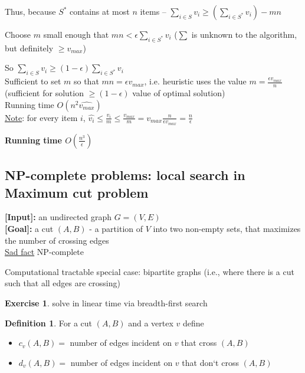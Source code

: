 \documentclass[a4paper,12pt]{article}
\theoremstyle{plain}
\theoremstyle{definition}
\newtheorem{problem}{Exercise}[section]
\newtheorem*{definition}{Definition}
\theoremstyle{remark}
\begin{document}
Thus, because $S^*$ contains at most $n$ items -- $\sum\limits_{i \in S} v_i \geq (\sum\limits_{i \in S^*} v_i) - mn$

Choose $m$ small enough that $mn < \epsilon \sum\limits_{i \in S^*} v_i$ ($\sum$ is unknown to the algorithm, but definitely $\geq v_{max}$)

So $\sum\limits_{i \in S} v_i \geq (1 - \epsilon) \sum\limits_{i \in S^*} v_i$
\\

Sufficient to set $m$ so that \underline{$mn = \epsilon v_{max}$}, i.e. heuristic uses the value $m = \frac{\epsilon v_{max}}{n}$ (sufficient for solution $\geq (1 - \epsilon)$ value of optimal solution)
\\

Running time $O(n^2 \widehat{v_{max}})$
\\

\underline{Note}: for every item $i$, $\widehat{v_i} \leq \frac{v_i}{m} \leq \frac{v_{max}}{m} = v_{max} \frac{n}{\epsilon v_{max}} = \frac {n}{\epsilon}$

\textbf{Running time $O(\frac{n^3}{\epsilon})$}



\subsection{NP-complete problems: local search in Maximum cut problem}
\textbf{[Input]:} an undirected graph $G = (V, E)$
\\

\textbf{[Goal]:} a cut $(A, B)$ - a partition of $V$ into two non-empty sets, that maximizes the number of crossing edges
\\

\underline{Sad fact} NP-complete

Computational tractable special case: bipartite graphs (i.e., where there is a cut such that all edges are crossing)

\begin{problem}solve in linear time via breadth-first search\end{problem}

\begin{definition}
For a cut $(A, B)$ and a vertex $v$ define
\begin{itemize}
	\item $c_v(A, B) =$ number of edges incident on $v$ that cross $(A, B)$
	\item $d_v(A, B) =$ number of edges incident on $v$ that don`t cross $(A, B)$
\end{itemize}
\end{definition}
\end{document}
